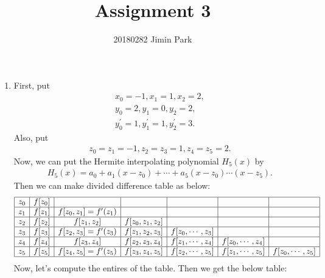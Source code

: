 \documentclass{article}
\begin{document}
\title{Assignment 3}
\author{20180282 Jimin Park}
\maketitle

\begin{enumerate}
    \item First, put
    \begin{align*}
        x_0 = -1, x_1 = 1, x_2 = 2,
        \\
        y_0 = 2, y_1 = 0, y_2 = 2,
        \\
        y_0^\prime = 1, y_1^\prime = 1, y_2^\prime = 3.
    \end{align*}
    Also, put
    \begin{align*}
        z_0 = z_1 = -1, z_2 = z_3 = 1, z_4 = z_5 = 2.
    \end{align*}
    Now, we can put the Hermite interpolating polynomial $H_5(x)$ by
    \begin{align}
        H_5(x) = a_0 + a_1(x-z_0) + \cdots + a_5(x-z_0)\cdots(x-z_5).
    \end{align}
    Then we can make divided difference table as below:
    \begin{align*}
        \begin{array}{|l|c|c|c|c|c|c|}
            \hline
            z_0 & f[z_0] &                              &&&&
            \\
            \hline
            z_1 & f[z_1] & f[z_0, z_1] = f^\prime(z_1)  &&&&
            \\
            \hline
            z_2 & f[z_2] & f[z_1, z_2]                  & f[z_0, z_1, z_2] &&&
            \\
            \hline
            z_3 & f[z_3] & f[z_2, z_3] = f^\prime(z_3)  & f[z_1, z_2, z_3] & f[z_0, \cdots, z_3] &&
            \\
            \hline
            z_4 & f[z_4] & f[z_3, z_4]                  & f[z_2, z_3, z_4] & f[z_1, \cdots, z_4] & f[z_0, \cdots, z_4] &
            \\
            \hline
            z_5 & f[z_5] & f[z_4, z_5] = f^\prime(z_5)  & f[z_3, z_4, z_5] & f[z_2, \cdots, z_5] & f[z_1, \cdots, z_5] & f[z_0, \cdots, z_5]
            \\
            \hline
        \end{array}
    \end{align*}
    Now, let's compute the entires of the table. Then we get the below table:
    \begin{align}

\end{align}
\end{enumerate}
\end{document}
